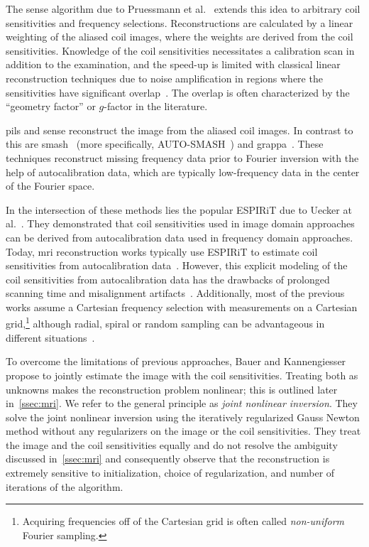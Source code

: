 The \gls{sense} algorithm due to Pruessmann et al.~\cite{pruessmann} extends this idea to arbitrary coil sensitivities and frequency selections.
Reconstructions are calculated by a linear weighting of the aliased coil images, where the weights are derived from the coil sensitivities.
Knowledge of the coil sensitivities necessitates a calibration scan in addition to the examination, and the speed-up is limited with classical linear reconstruction techniques due to noise amplification in regions where the sensitivities have significant overlap~\cite{Blaimer2004,pruessmann,Robson2008}.
The overlap is often characterized by the \enquote{geometry factor} or \( g \)-factor in the literature\cite{Robson2008}.

\Gls{pils} and \gls{sense} reconstruct the image from the aliased coil images.
In contrast to this are \gls{smash}~\cite{sodickson_simultaneous_1997} (more specifically, AUTO-SMASH~\cite{Jakob1998}) and \gls{grappa}~\cite{griswold_generalized_2002}.
These techniques reconstruct missing frequency data prior to Fourier inversion with the help of autocalibration data, which are typically low-frequency data in the center of the Fourier space.

In the intersection of these methods lies the popular ESPIRiT due to Uecker at al.~\cite{uecker_espirit_13}.
They demonstrated that coil sensitivities used in image domain approaches can be derived from autocalibration data used in frequency domain approaches.
Today, \gls{mri} reconstruction works typically use ESPIRiT to estimate coil sensitivities from autocalibration data~\cite{Aggarwal2019,darestani2021measuring,hammernik_learning_2017,jalal_robust_comporessed_2021,luo_bayesian_2023,zhu_image_2018}.
However, this explicit modeling of the coil sensitivities from autocalibration data has the drawbacks of prolonged scanning time and misalignment artifacts~\cite{Knoll2011,Ying2007}.
Additionally, most of the previous works assume a Cartesian frequency selection with measurements on a Cartesian grid,\footnote{%
	Acquiring frequencies off of the Cartesian grid is often called \emph{non-uniform} Fourier sampling.
} although radial, spiral or random sampling can be advantageous in different situations~\cite{lustid_compressed_2007,lustig2005faster,uecker_image_2008}.

To overcome the limitations of previous approaches, Bauer and Kannengiesser \cite{bauer_efficient_2007} propose to jointly estimate the image with the coil sensitivities.
Treating both as unknowns makes the reconstruction problem nonlinear; this is outlined later in~\cref{ssec:mri}.
We refer to the general principle as \emph{joint nonlinear inversion}.
They solve the joint nonlinear inversion using the iteratively regularized Gauss Newton method without any regularizers on the image or the coil sensitivities.
They treat the image and the coil sensitivities equally and do not resolve the ambiguity discussed in~\cref{ssec:mri} and consequently observe that the reconstruction is extremely sensitive to initialization, choice of regularization, and number of iterations of the algorithm.

